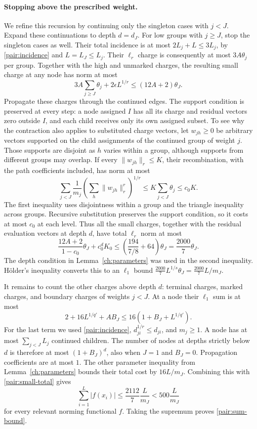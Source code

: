 \paragraph{Stopping above the prescribed weight.}
We refine this recursion by continuing only the singleton cases with
$j<J$.  Expand these continuations to depth $d=d_J$.  For low groups
with $j\ge J$, stop the singleton cases as well.  Their total incidence
is at most $2L_j+L\le3L_j$, by \eqref{pair:incidence} and $L=L_J\le L_j$.
Their $\ell_r$ charge is consequently at most $3A\theta_j$ per group.
Together with the high and unmarked charges, the resulting small charge
at any node has norm at most
\[
 3A\sum_{j\ge J}\theta_j+2\epsilon L^{1/r}
 \le(12A+2)\theta_J.
\]
Propagate these charges through the continued edges.  The support
condition is preserved at every step: a node assigned $I$ has all its
charge and residual vectors zero outside $I$, and each child receives
only its own assigned subset.  To see why the contraction also applies
to substituted charge vectors, let $w_{jh}\ge0$ be arbitrary vectors
supported on the child assignments of the continued group of weight $j$.
Those supports are disjoint as $h$ varies within a group, although
supports from different groups may overlap.  If every $\|w_{jh}\|_r\le K$,
their recombination, with the path coefficients included, has norm at most
\[
 \sum_{j<J}\frac1{m_j}
       \left(\sum_h\|w_{jh}\|_r^r\right)^{1/r}
 \le K\sum_{j<J}\theta_j\le c_0K.
\]
The first inequality uses disjointness within a group and the triangle
inequality across groups.  Recursive substitution preserves the support
condition, so it costs at most $c_0$ at each level.
Thus all the small charges, together with
the residual evaluation vectors at depth $d$, have total $\ell_r$ norm
at most
\begin{equation}\label{pair:small-total}
 \frac{12A+2}{1-c_0}\theta_J+c_0^dK_0
 \le\left(\frac{194}{7/8}+64\right)\theta_J
 =\frac{2000}{7}\theta_J.
\end{equation}
The depth condition in Lemma~\ref{ch:parameters} was used in the second
inequality.  H\"older's inequality converts this to an $\ell_1$ bound
$\frac{2000}{7}L^{1/s}\theta_J=\frac{2000}{7}L/m_J$.

It remains to count the other charges above depth $d$: terminal charges,
marked charges, and boundary charges of weights $j<J$.  At a node their
$\ell_1$ sum is at most
\[
 2+16L^{1/q'}+A B_J
 \le16(1+B_J+L^{1/q'}).
\]
For the last term we used \eqref{pair:incidence}, $d_{ji}^{1/r}\le d_{ji}$,
and $m_j\ge1$.  A node has at most $\sum_{j<J}L_j$ continued children.
The number of nodes at depths strictly below $d$ is therefore at most
$(1+B_J)^d$, also when $J=1$ and $B_J=0$.  Propagation coefficients are
at most $1$.  The other parameter inequality from
Lemma~\ref{ch:parameters} bounds their total cost by $16L/m_J$.
Combining this with \eqref{pair:small-total} gives
\[
 \sum_{i=1}^L|f(x_i)|\le\frac{2112}{7}\frac L{m_J}
 <500\frac L{m_J}
\]
for every relevant norming functional $f$.  Taking the supremum proves
\eqref{pair:sum-bound}.

